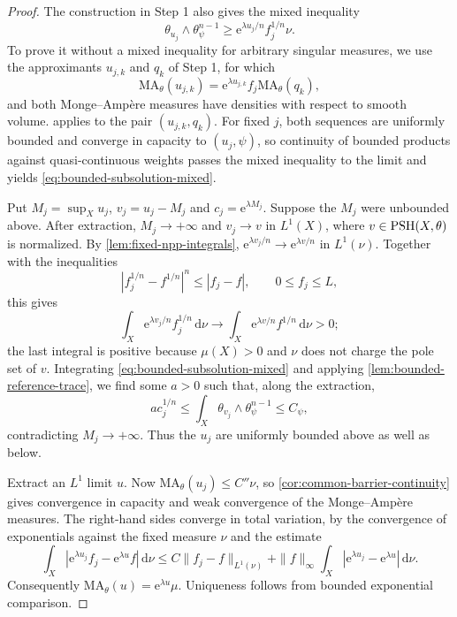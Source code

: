 \begin{proof}
The construction in Step 1 also gives the mixed inequality
\begin{equation}\label{eq:bounded-subsolution-mixed}
 \theta_{u_j}\wedge\theta_\psi^{n-1}
 \geq \mathrm{e}^{\lambda u_j/n}f_j^{1/n}\nu.
\end{equation}
To prove it without a mixed inequality for arbitrary singular measures, we use the approximants $u_{j,k}$ and $q_k$ of Step 1, for which
\[
 \mathrm{MA}_\theta(u_{j,k})
     =\mathrm{e}^{\lambda u_{j,k}}f_j\mathrm{MA}_\theta(q_k),
\]
and both Monge--Amp\`ere measures have densities with respect to smooth volume.  applies to the pair $(u_{j,k},q_k)$. For fixed $j$, both sequences are uniformly bounded and converge in capacity to $(u_j,\psi)$, so continuity of bounded products against quasi-continuous weights passes the mixed inequality to the limit and yields \eqref{eq:bounded-subsolution-mixed}.

Put $M_j=\sup_Xu_j$, $v_j=u_j-M_j$ and $c_j=\mathrm{e}^{\lambda M_j}$. Suppose the $M_j$ were unbounded above. After extraction, $M_j\to+\infty$ and $v_j\to v$ in $L^1(X)$, where $v\in\mathrm{PSH}(X,\theta)$ is normalized. By \cref{lem:fixed-npp-integrals},
$\mathrm{e}^{\lambda v_j/n}\to \mathrm{e}^{\lambda v/n}$ in $L^1(\nu)$. Together with the inequalities
\[
 |f_j^{1/n}-f^{1/n}|^n\leq|f_j-f|,
 \qquad0\leq f_j\leq L,
\]
this gives
\[
 \int_X \mathrm{e}^{\lambda v_j/n}f_j^{1/n}\,\mathrm{d}\nu
 \longrightarrow\int_X\mathrm{e}^{\lambda v/n}f^{1/n}\,\mathrm{d}\nu>0;
\]
the last integral is positive because $\mu(X)>0$ and $\nu$ does not charge the pole set of $v$. Integrating \eqref{eq:bounded-subsolution-mixed} and applying \cref{lem:bounded-reference-trace}, we find some $a>0$ such that, along the extraction,
\[
 a c_j^{1/n}\leq
 \int_X\theta_{v_j}\wedge\theta_\psi^{n-1}\leq C_\psi,
\]
contradicting $M_j\to+\infty$. Thus the $u_j$ are uniformly bounded above as well as below.

Extract an $L^1$ limit $u$. Now $\mathrm{MA}_\theta(u_j)\leq C''\nu$, so \cref{cor:common-barrier-continuity} gives convergence in capacity and weak convergence of the Monge--Amp\`ere measures. The right-hand sides converge in total variation, by the convergence of exponentials against the fixed measure $\nu$ and the estimate
\[
 \int_X|\mathrm{e}^{\lambda u_j}f_j-\mathrm{e}^{\lambda u}f|\,\mathrm{d}\nu
 \leq C\|f_j-f\|_{L^1(\nu)}
       +\|f\|_\infty\int_X|\mathrm{e}^{\lambda u_j}-\mathrm{e}^{\lambda u}|\,\mathrm{d}\nu.
\]
Consequently $\mathrm{MA}_\theta(u)=\mathrm{e}^{\lambda u}\mu$. Uniqueness follows from bounded exponential comparison.
\end{proof}
